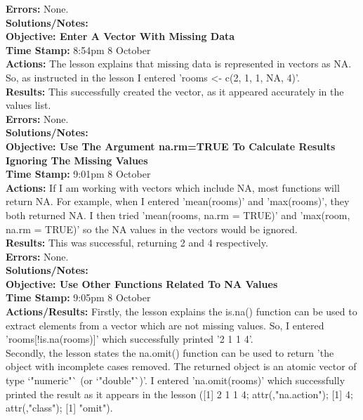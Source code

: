 \documentclass{article}
\begin{document}
\begin{FlushLeft}
\textbf{Errors:} None.\\
\textbf{Solutions/Notes:}\\
\vspace{5mm}
\textbf{Objective: Enter A Vector With Missing Data}\\ 
\textbf{Time Stamp:} 8:54pm 8 October\\
\textbf{Actions:} The lesson explains that missing data is represented in vectors as NA. So, as instructed in the lesson I entered 'rooms \textless - c(2, 1, 1, NA, 4)'. \\
\textbf{Results:} This successfully created the vector, as it appeared accurately in the values list.\\
\textbf{Errors:} None.\\
\textbf{Solutions/Notes:}\\
\vspace{5mm}
\textbf{Objective: Use The Argument na.rm=TRUE To Calculate Results Ignoring The Missing Values}\\ 
\textbf{Time Stamp:} 9:01pm 8 October\\
\textbf{Actions:} If I am working with vectors which include NA, most functions will return NA. For example, when I entered 'mean(rooms)' and 'max(rooms)', they both returned NA. I then tried 'mean(rooms, na.rm = TRUE)' and 'max(room, na.rm = TRUE)' so the NA values in the vectors would be ignored.\\
\textbf{Results:} This was successful, returning 2 and 4 respectively.\\
\textbf{Errors:} None.\\
\textbf{Solutions/Notes:}\\
\vspace{5mm}
\textbf{Objective: Use Other Functions Related To NA Values}\\ 
\textbf{Time Stamp:} 9:05pm 8 October\\
\textbf{Actions/Results:} Firstly, the lesson explains the is.na() function can be used to extract elements from a vector which are not missing values. So, I entered 'rooms[!is.na(rooms)]' which successfully printed '2 1 1 4'.\\
Secondly, the lesson states the na.omit() function can be used to return 'the object with incomplete cases removed. The returned object is an atomic vector of type `"numeric"` (or `"double"`)'. I entered 'na.omit(rooms)' which successfully printed the result as it appears in the lesson ([1] 2 1 1 4; attr(,"na.action"); [1] 4; attr(,"class"); [1] "omit").\\

\end{FlushLeft}
\end{document}
